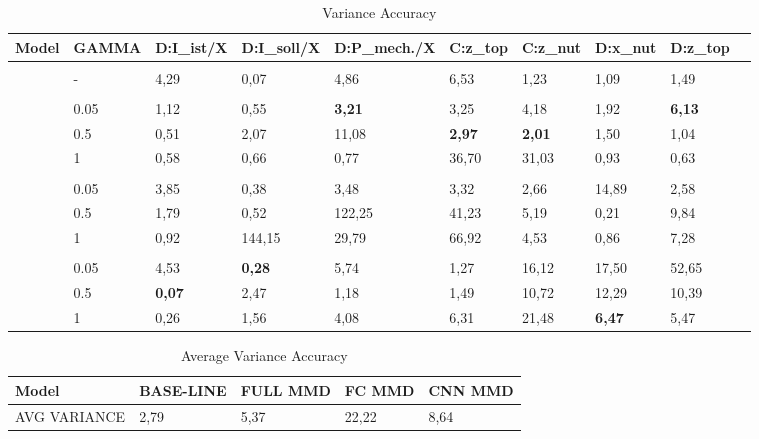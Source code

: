 \begin {table}[H]
\centering
\begin{adjustwidth}{-.5cm}{}
\begin{tabular}{llllllllll}
  \toprule
  Model          & GAMMA    & D:I\_ist/X & D:I\_soll/X & D:P\_mech./X & C:z\_top & C:z\_nut & D:x\_nut & D:z\_top  \\
  \midrule
  \parbox[t]{2mm}{} &&&&&&&&\\
                  & -      & 4,29 & 0,07 & 4,86 & 6,53 & 1,23 & 1,09 & 1,49\\
\vspace{.1cm}
 \parbox[t]{2mm}{} &&&&&&&&&\\
 
                  & 0.05   & 1,12 & 0,55 & \textbf{3,21} & 3,25 & 4,18 & 1,92 & \textbf{6,13}\\
                  & 0.5    & 0,51 & 2,07 & 11,08 & \textbf{2,97} & \textbf{2,01} & 1,50 & 1,04\\
                  & 1      & 0,58 & 0,66 & 0,77 & 36,70 & 31,03 & 0,93 & 0,63\\
\vspace{.1cm}
 \parbox[t]{2mm}{} &&&&&&&&&\\
                  & 0.05   & 3,85 & 0,38 & 3,48 & 3,32 & 2,66 & 14,89 & 2,58\\
                  & 0.5    & 1,79 & 0,52 & 122,25 & 41,23 & 5,19 & 0,21 & 9,84\\
                  & 1      & 0,92 & 144,15 & 29,79 & 66,92 & 4,53 & 0,86 & 7,28\\
\vspace{.1cm}
 \parbox[t]{2mm}{} &&&&&&&&&\\
                  & 0.05   & 4,53 & \textbf{0,28} & 5,74 & 1,27 & 16,12 & 17,50 & 52,65\\
                  & 0.5    & \textbf{0,07} & 2,47 & 1,18 & 1,49 & 10,72 & 12,29 & 10,39\\
                  & 1      & 0,26 & 1,56 & 4,08 & 6,31 & 21,48 & \textbf{6,47} & 5,47\\
  \bottomrule
\end{tabular}
\end{adjustwidth}
\caption {Variance Accuracy} \label{tab:Variance_Accuracy} 
\end {table}



\begin {table}[H]
\centering
\begin{tabular}{lllll}
  \toprule
  Model & BASE-LINE & FULL MMD & FC MMD & CNN MMD\\
  \midrule
  AVG VARIANCE & 2,79 & 5,37 & 22,22 & 8,64\\
  \bottomrule
\end{tabular}
\caption {Average Variance Accuracy} \label{tab:Average_Variance_Accuracy} 
\end {table}